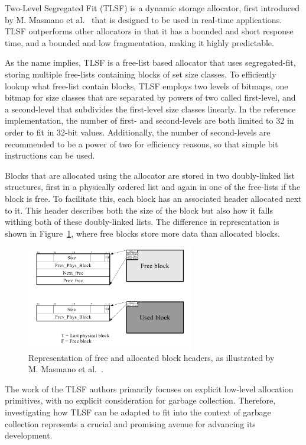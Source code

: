 
Two-Level Segregated Fit (TLSF) is a dynamic storage allocator, first introduced by M. Masmano et al.~\cite{TLSF} that is designed to be used in real-time applications. TLSF outperforms other allocators in that it has a bounded and short response time, and a bounded and low fragmentation, making it highly predictable.

As the name implies, TLSF is a free-list based allocator that uses segregated-fit, storing multiple free-lists containing blocks of set size classes. To efficiently lookup what free-list contain blocks, TLSF employs two levels of bitmaps, one bitmap for size classes that are separated by powers of two called first-level, and a second-level that subdivides the first-level size classes linearly. In the reference implementation, the number of first- and second-levels are both limited to 32 in order to fit in 32-bit values. Additionally, the number of second-levels are recommended to be a power of two for efficiency reasons, so that simple bit instructions can be used.

Blocks that are allocated using the allocator are stored in two doubly-linked list structures, first in a physically ordered list and again in one of the free-lists if the block is free. To facilitate this, each block has an associated header allocated next to it. This header describes both the size of the block but also how it falls withing both of these doubly-linked lists. The difference in representation is shown in Figure~\ref{fig:blockheader_reference}, where free blocks store more data than allocated blocks.

\begin{figure}[H]
    \centering
    \includegraphics[width=0.65\textwidth]{figures/blockheader_reference.png}
    \caption{Representation of free and allocated block headers, as illustrated by M. Masmano et al.~\cite{TLSF}.}
    \label{fig:blockheader_reference}
\end{figure}

The work of the TLSF authors primarily focuses on explicit low-level allocation primitives, with no explicit consideration for garbage collection. Therefore, investigating how TLSF can be adapted to fit into the context of garbage collection represents a crucial and promising avenue for advancing its development.

